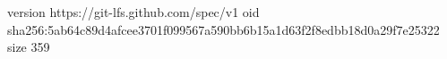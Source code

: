 version https://git-lfs.github.com/spec/v1
oid sha256:5ab64c89d4afcee3701f099567a590bb6b15a1d63f2f8edbb18d0a29f7e25322
size 359
